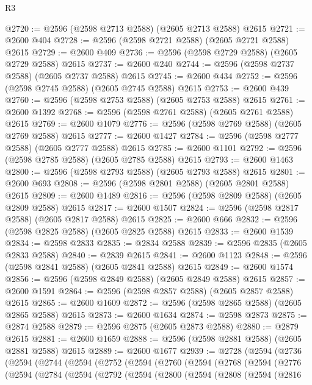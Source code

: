 \begin{lexlean}{R3}
\begin{coremodule}
@2720 := @2596 (@2598 @2713 @2588) (@2605 @2713 @2588) @2615
@2721 := @2600 @404
@2728 := @2596 (@2598 @2721 @2588) (@2605 @2721 @2588) @2615
@2729 := @2600 @409
@2736 := @2596 (@2598 @2729 @2588) (@2605 @2729 @2588) @2615
@2737 := @2600 @240
@2744 := @2596 (@2598 @2737 @2588) (@2605 @2737 @2588) @2615
@2745 := @2600 @434
@2752 := @2596 (@2598 @2745 @2588) (@2605 @2745 @2588) @2615
@2753 := @2600 @439
@2760 := @2596 (@2598 @2753 @2588) (@2605 @2753 @2588) @2615
@2761 := @2600 @1392
@2768 := @2596 (@2598 @2761 @2588) (@2605 @2761 @2588) @2615
@2769 := @2600 @1079
@2776 := @2596 (@2598 @2769 @2588) (@2605 @2769 @2588) @2615
@2777 := @2600 @1427
@2784 := @2596 (@2598 @2777 @2588) (@2605 @2777 @2588) @2615
@2785 := @2600 @1101
@2792 := @2596 (@2598 @2785 @2588) (@2605 @2785 @2588) @2615
@2793 := @2600 @1463
@2800 := @2596 (@2598 @2793 @2588) (@2605 @2793 @2588) @2615
@2801 := @2600 @693
@2808 := @2596 (@2598 @2801 @2588) (@2605 @2801 @2588) @2615
@2809 := @2600 @1489
@2816 := @2596 (@2598 @2809 @2588) (@2605 @2809 @2588) @2615
@2817 := @2600 @1507
@2824 := @2596 (@2598 @2817 @2588) (@2605 @2817 @2588) @2615
@2825 := @2600 @666
@2832 := @2596 (@2598 @2825 @2588) (@2605 @2825 @2588) @2615
@2833 := @2600 @1539
@2834 := @2598 @2833
@2835 := @2834 @2588
@2839 := @2596 @2835 (@2605 @2833 @2588)
@2840 := @2839 @2615
@2841 := @2600 @1123
@2848 := @2596 (@2598 @2841 @2588) (@2605 @2841 @2588) @2615
@2849 := @2600 @1574
@2856 := @2596 (@2598 @2849 @2588) (@2605 @2849 @2588) @2615
@2857 := @2600 @1591
@2864 := @2596 (@2598 @2857 @2588) (@2605 @2857 @2588) @2615
@2865 := @2600 @1609
@2872 := @2596 (@2598 @2865 @2588) (@2605 @2865 @2588) @2615
@2873 := @2600 @1634
@2874 := @2598 @2873
@2875 := @2874 @2588
@2879 := @2596 @2875 (@2605 @2873 @2588)
@2880 := @2879 @2615
@2881 := @2600 @1659
@2888 := @2596 (@2598 @2881 @2588) (@2605 @2881 @2588) @2615
@2889 := @2600 @1677
@2939 := @2728
    (@2594
      (@2736
        (@2594
          (@2744
            (@2594
              (@2752
                (@2594
                  (@2760
                    (@2594
                      (@2768
                        (@2594
                          (@2776
                            (@2594
                              (@2784
                                (@2594
                                  (@2792
                                    (@2594
                                      (@2800
                                        (@2594
                                          (@2808
                                            (@2594
                                              (@2816

\end{coremodule}
\end{lexlean}

